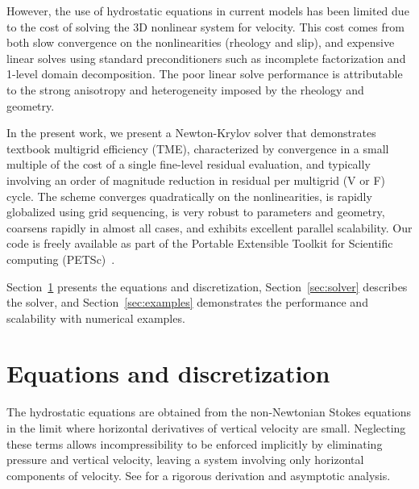 \documentclass[10pt,letterpaper,oneeqnum,final]{siamltex}
\begin{document}
However, the use of hydrostatic equations in current models has been limited due to the cost of solving
the 3D nonlinear system for velocity.  This cost comes from both slow convergence on the
nonlinearities (rheology and slip), and expensive linear solves using standard preconditioners such
as incomplete factorization and 1-level domain decomposition.  The poor linear solve performance is
attributable to the strong anisotropy and heterogeneity imposed by the rheology and geometry.

In the present work, we present a Newton-Krylov solver that demonstrates textbook multigrid
efficiency (TME), characterized by convergence in a small multiple of the cost of a single
fine-level residual evaluation, and typically involving an order of magnitude reduction in residual
per multigrid (V or F) cycle.  The scheme converges quadratically on the nonlinearities, is rapidly
globalized using grid sequencing, is very robust to parameters and geometry, coarsens rapidly in
almost all cases, and exhibits excellent parallel scalability.  Our code is freely available as part
of the Portable Extensible Toolkit for Scientific computing (PETSc)~\cite{petsc-web-page}.

Section~\ref{sec:equations} presents the equations and discretization, Section~\ref{sec:solver}
describes the solver, and Section~\ref{sec:examples} demonstrates the performance and scalability
with numerical examples.

\section{Equations and discretization}\label{sec:equations}
The hydrostatic equations are obtained from the non-Newtonian Stokes equations in the limit where
horizontal derivatives of vertical velocity are small.  Neglecting these terms allows
incompressibility to be enforced implicitly by eliminating pressure and vertical velocity, leaving a
system involving only horizontal components of velocity.  See \cite{schoof2010thin} for a rigorous
derivation and asymptotic analysis.
\end{document}
